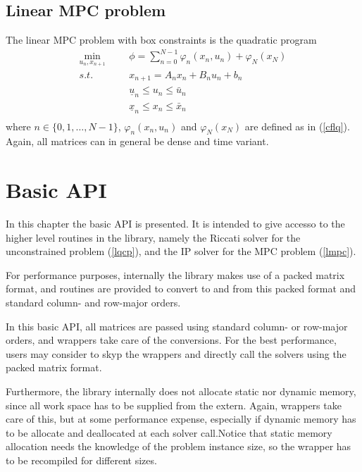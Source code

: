 \documentclass[a4paper]{report}
\begin{document}
\section{Linear MPC problem}

The linear MPC problem with box constraints is the quadratic program
\begin{equation}
\begin{aligned}
\min_{u_n,x_{n+1}} &&& \phi = \sum_{n=0}^{N-1} \varphi_n(x_n,u_n) + \varphi_N(x_N) \\
s.t. &&& x_{n+1} = A_nx_n+B_nu_n+b_n \\
&&& \underline{u}_n\leq u_n\leq\bar{u}_n \\
&&& \underline{x}_n\leq x_n\leq\bar{x}_n \\
\end{aligned}
\label{lmpc}
\end{equation}
where $n\in\{0,1,\dots,N-1\}$, $\varphi_n(x_n,u_n)$ and $\varphi_N(x_N)$ are defined as in (\ref{cflq}). Again, all matrices can in general be dense and time variant.


\chapter{Basic API}

In this chapter the basic API is presented. 
It is intended to give accesso to the higher level routines in the library, namely the Riccati solver for the unconstrained problem (\ref{lqcp}), and the IP solver for the MPC problem (\ref{lmpc}).

For performance purposes, internally the library makes use of a packed matrix format, and routines are provided to convert to and from this packed format and standard column- and row-major orders.

In this basic API, all matrices are passed using standard column- or row-major orders, and wrappers take care of the conversions.
For the best performance, users may consider to skyp the wrappers and directly call the solvers using the packed matrix format.

Furthermore, the library internally does not allocate static nor dynamic memory, since all work space has to be supplied from the extern.
Again, wrappers take care of this, but at some performance expense, especially if dynamic memory has to be allocate and deallocated at each solver call.Notice that static memory allocation needs the knowledge of the problem instance size, so the wrapper has to be recompiled for different sizes.
\end{document}
